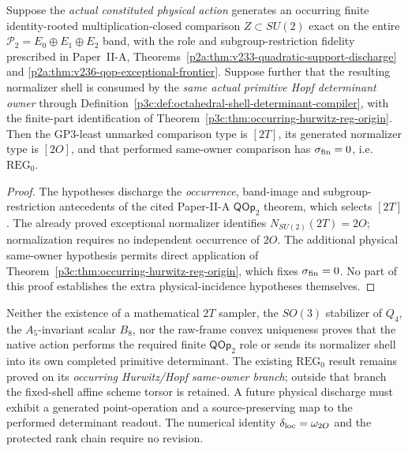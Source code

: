 \documentclass[12pt,a4paper]{article}
\begin{document}
\begin{corollary}
\label{p3c:cor:v1188-conditional-reg-incidence}
Suppose the \emph{actual constituted physical action} generates an
occurring finite identity-rooted multiplication-closed comparison
$Z\subset SU(2)$ exact on the entire
$\mathcal P_2=E_0\oplus E_1\oplus E_2$ band, with the role and
subgroup-restriction fidelity prescribed in Paper~II-A,
Theorems~\ref{p2a:thm:v233-quadratic-support-discharge} and
\ref{p2a:thm:v236-qop-exceptional-frontier}.  Suppose further
that the resulting normalizer shell is consumed by the \emph{same
actual primitive Hopf determinant owner} through
Definition~\ref{p3c:def:octahedral-shell-determinant-compiler},
with the finite-part identification of
Theorem~\ref{p3c:thm:occurring-hurwitz-reg-origin}.
Then the GP3-least unmarked comparison type is $[2T]$, its
generated normalizer type is $[2O]$, and that performed
same-owner comparison has $\sigma_{\rm fin}=0$, i.e.
$\mathrm{REG}_0$.
\end{corollary}
\begin{proof}
The hypotheses discharge the \emph{occurrence}, band-image and
subgroup-restriction antecedents of the cited Paper-II-A
$\mathsf{QOp}_2$ theorem, which selects $[2T]$.  The already
proved exceptional normalizer identifies $N_{SU(2)}(2T)=2O$;
normalization requires no independent occurrence of $2O$.
The additional physical same-owner hypothesis permits direct
application of
Theorem~\ref{p3c:thm:occurring-hurwitz-reg-origin},
which fixes $\sigma_{\rm fin}=0$.  No part of this proof establishes
the extra physical-incidence hypotheses themselves.
\end{proof}

\begin{remark}
\label{p3c:rem:v1188-incidence-status}
Neither the existence of a mathematical $2T$ sampler, the
$SO(3)$ stabilizer of $Q_4$, the $A_5$-invariant scalar $B_8$,
nor the raw-frame convex uniqueness proves that the native action
performs the required finite $\mathsf{QOp}_2$ role or sends its
normalizer shell into its own completed primitive determinant.
The existing $\mathrm{REG}_0$ result remains proved on its
\emph{occurring Hurwitz/Hopf same-owner branch}; outside that
branch the fixed-shell affine scheme torsor is retained.
A future physical discharge must exhibit a generated point-operation
and a source-preserving map to the performed determinant readout.
The numerical identity $\delta_{\rm loc}=\omega_{2O}$ and the
protected rank chain require no revision.
\end{remark}
\end{document}
